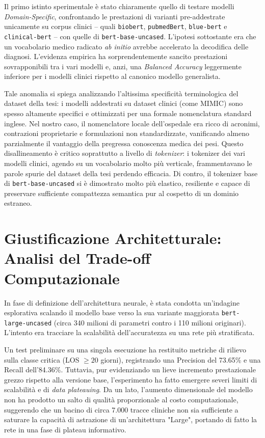 Il primo istinto sperimentale è stato chiaramente quello di testare modelli \textit{Domain-Specific}, confrontando le prestazioni di varianti pre-addestrate unicamente su corpus clinici -- quali \texttt{biobert}, \texttt{pubmedBert}, \texttt{blue-bert} e \texttt{clinical-bert} -- con quelle di \texttt{bert-base-uncased}. L'ipotesi sottostante era che un vocabolario medico radicato \textit{ab initio} avrebbe accelerato la decodifica delle diagnosi. L'evidenza empirica ha sorprendentemente sancito prestazioni sovrapponibili tra i vari modelli e, anzi, una \textit{Balanced Accuracy} leggermente inferiore per i modelli clinici rispetto al canonico modello generalista. 

Tale anomalia si spiega analizzando l'altissima specificità terminologica del dataset della tesi: i modelli addestrati su dataset clinici (come MIMIC) sono spesso altamente specifici e ottimizzati per una formale nomenclatura standard inglese. Nel nostro caso, il nomenclatore locale dell'ospedale era ricco di acronimi, contrazioni proprietarie e formulazioni non standardizzate, vanificando almeno parzialmente il vantaggio della pregressa conoscenza medica dei pesi. Questo disallineamento è critico soprattutto a livello di \textit{tokenizer}: i tokenizer dei vari modelli clinici, agendo su un vocabolario molto più verticale, frammentavano le parole spurie del dataset della tesi perdendo efficacia. Di contro, il tokenizer base di \texttt{bert-base-uncased} si è dimostrato molto più elastico, resiliente e capace di preservare sufficiente compattezza semantica pur al cospetto di un dominio estraneo.

\section{Giustificazione Architetturale: Analisi del Trade-off Computazionale}
In fase di definizione dell'architettura neurale, è stata condotta un'indagine esplorativa scalando il modello base verso la sua variante maggiorata \texttt{bert-large-uncased} (circa 340 milioni di parametri contro i 110 milioni originari). L'intento era tracciare la scalabilità dell'accuratezza su una rete più stratificata.

Un test preliminare su una singola esecuzione ha restituito metriche di rilievo sulla classe critica (LOS $\ge 20$ giorni), registrando una Precision del 73.65\% e una Recall dell'84.36\%. Tuttavia, pur evidenziando un lieve incremento prestazionale grezzo rispetto alla versione base, l'esperimento ha fatto emergere severi limiti di scalabilità e di \textit{data plateauing}. Da un lato, l'aumento dimensionale del modello non ha prodotto un salto di qualità proporzionale al costo computazionale, suggerendo che un bacino di circa 7.000 tracce cliniche non sia sufficiente a saturare la capacità di astrazione di un'architettura "Large", portando di fatto la rete in una fase di plateau informativo.


